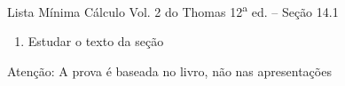 \documentclass[fleqn,utf8,aspectratio=169,12pt]{beamer}
\begin{document}
\begin{frame}{Lista Mínima}
  Cálculo Vol. 2 do Thomas 12\textsuperscript{a} ed. -- Seção 14.1
  \begin{enumerate}
    \item Estudar o texto da seção
  \end{enumerate}

  \vfill
  Atenção: A prova é baseada no livro, não nas apresentações
\end{frame}

\end{document}
